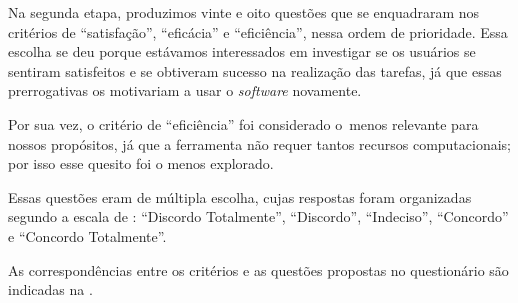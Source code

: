 \documentclass[portuguese]{textolivre}
\begin{document}
Na segunda etapa, produzimos vinte e oito questões que se enquadraram nos critérios de “satisfação”, “eficácia” e “eficiência”, nessa ordem de prioridade. Essa escolha se deu porque estávamos interessados em investigar se os usuários se sentiram satisfeitos e se obtiveram sucesso na realização das tarefas, já que essas prerrogativas os motivariam a usar o \textit{software} novamente.

Por sua vez, o critério de “eficiência” foi considerado o menos relevante para nossos propósitos, já que a ferramenta não requer tantos recursos computacionais; por isso esse quesito foi o menos explorado.

Essas questões eram de múltipla escolha, cujas respostas foram organizadas segundo a escala de \textcite{likert1932}: “Discordo Totalmente”, “Discordo”, “Indeciso”, “Concordo” e “Concordo Totalmente”.

As correspondências entre os critérios e as questões propostas no questionário são indicadas na .
\end{document}
